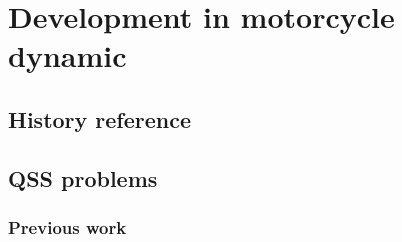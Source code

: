 \section{Development in motorcycle dynamic}
\label{chapter1_3}
\subsection{History reference}
\subsection{QSS problems}
\subsubsection{Previous work}